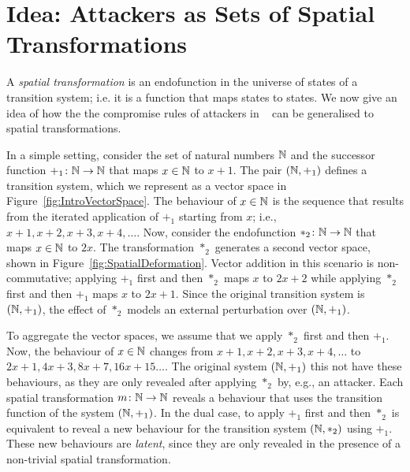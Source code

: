 \section{Idea: Attackers as Sets of Spatial Transformations}
A \emph{spatial transformation} is an endofunction in the universe of states of a transition system; i.e. it is a function that maps states to states. We now give an idea of how the the compromise rules of attackers in ~\cite{KnowYourEnemy} can be generalised to spatial transformations. 

In a simple setting, consider the set of natural numbers $\mathbb{N}$ and the successor function $+_1\colon \mathbb{N}\rightarrow \mathbb{N}$ that maps $x\in \mathbb{N}$ to $x+1$. The pair $(\mathbb{N}, +_1)$ defines a transition system, which we represent as a vector space in Figure~\ref{fig:IntroVectorSpace}.
\missingfigure{\label{fig:IntroVectorSpace}}
The behaviour of $x\in \mathbb{N}$ is the sequence that results from the iterated application of $+_1$ starting from $x$; i.e., $x+1,x+2,x+3,x+4,\ldots$. Now, consider the endofunction $*_2\colon \mathbb{N}\rightarrow \mathbb{N}$ that maps $x\in \mathbb{N}$ to $2x$. The transformation $*_2$ generates a second vector space, shown in Figure~\ref{fig:SpatialDeformation}. Vector addition in this scenario is non-commutative; applying $+_1$ first and then $*_2$ maps $x$ to $2x+2$ while applying $*_2$ first and then $+_1$ maps $x$ to $2x+1$. Since the original transition system is $(\mathbb{N}, +_1)$, the effect of $*_2$ models an external perturbation over $(\mathbb{N}, +_1)$.

To aggregate the vector spaces, we assume that we apply $*_2$ first and then $+_1$. Now, the behaviour of $x\in\mathbb{N}$ changes from $x+1,x+2,x+3,x+4,\ldots$ to $2x+1,4x+3,8x+7,16x+15\ldots$. The original system $(\mathbb{N}, +_1)$ this not have these behaviours, as they are only revealed after applying $*_2$ by, e.g., an attacker. Each spatial transformation $m\colon \mathbb{N}\rightarrow \mathbb{N}$ reveals a behaviour that uses the transition function of the system $(\mathbb{N}, +_1)$. In the dual case, to apply $+_1$ first and then $*_2$ is equivalent to reveal a new behaviour for the transition system $(\mathbb{N}, *_2)$ using $+_1$. These new behaviours are \emph{latent}, since they are only revealed in the presence of a non-trivial spatial transformation. 
\missingfigure{\label{fig:SpatialDeformation}}

